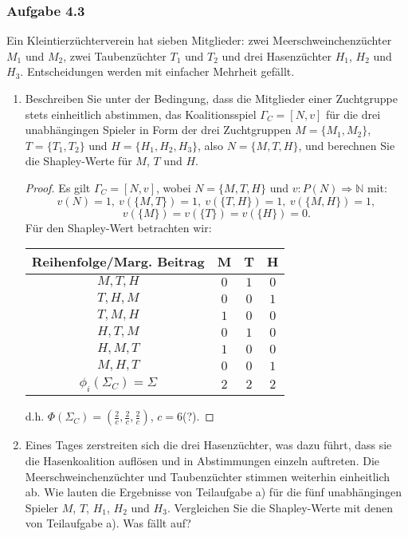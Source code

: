 \documentclass[12pt]{extreport} %
\newcommand{\N}{\mathbb{N}}
\theoremstyle{named}
\theoremstyle{itshape}
\theoremstyle{normal}
\begin{document}
\subsubsection*{Aufgabe 4.3}

Ein Kleintierzüchterverein hat sieben Mitglieder: zwei Meerschweinchenzüchter $M_1$ und $M_2$, zwei Taubenzüchter $T_1$ und $T_2$ und drei Hasenzüchter $H_1$, $H_2$ und $H_3$. Entscheidungen werden mit einfacher Mehrheit gefällt.

  \begin{enumerate}
 	\item Beschreiben Sie unter der Bedingung, dass die Mitglieder einer Zuchtgruppe stets einheitlich abstimmen, das Koalitionsspiel $\Gamma_C = [N, v]$ für die drei unabhängingen Spieler in Form der drei Zuchtgruppen $M = \{M_1,M_2\}$, $T = \{T_1, T_2\}$ und $H = \{H_1,H_2,H_3\}$, also $N = \{M, T, H\}$, und berechnen Sie die Shapley-Werte für $M$, $T$ und $H$.
 		\begin{proof}
 			Es gilt $\Gamma_C = [N, v]$, wobei $N = \{ M, T, H \}$ und $v \colon P(N) \Rightarrow \N$ mit:
 			$$ v(N) = 1, ~ v(\{M, T\}) = 1, ~ v(\{T, H\}) = 1, ~ v(\{M,H\}) = 1,$$
 			$$  v(\{M\}) = v(\{T\}) = v(\{H\}) = 0. $$
			Für den Shapley-Wert betrachten wir:
  			\begin{center}
    			\begin{tabular}{| c | c | c | c |}
   					\hline
    					Reihenfolge/Marg. Beitrag & M & T & H \\ 
    						\hline
    					$M, T, H$ & $0$ & $1$ & $0$  \\ 
    						\hline
    					$T, H, M$ & $0$ & $0$ & $1$  \\
    						\hline
    					$T, M, H$ & $1$ & $0$ & $0$  \\
       						\hline
    					$H, T, M$ & $0$ & $1$ & $0$  \\
      						\hline
    					$H, M, T$ & $1$ & $0$ & $0$  \\
      						\hline
    					$M, H, T$ & $0$ & $0$ & $1$  \\
      						\hline \hline
    					$\phi_{i}(\Sigma_{C}) = \Sigma$  & $2$ & $2$ & $2$  \\
    				\hline
   				 \end{tabular}
    		\end{center}
    		d.h. $\Phi(\Sigma_{C}) = \left(\frac{2}{c}, \frac{2}{c}, \frac{2}{c} \right)$, $c = 6$(?).
 		\end{proof}
	\item Eines Tages zerstreiten sich die drei Hasenzüchter, was dazu führt, dass sie die Hasenkoalition auflösen und in Abstimmungen einzeln auftreten. Die Meerschweinchenzüchter und Taubenzüchter stimmen weiterhin einheitlich ab. Wie lauten die Ergebnisse von Teilaufgabe a) für die fünf unabhängingen Spieler $M$, $T$, $H_1$, $H_2$ und $H_3$. Vergleichen Sie die Shapley-Werte mit denen von Teilaufgabe a). Was fällt auf?

\end{enumerate}
\end{document}
